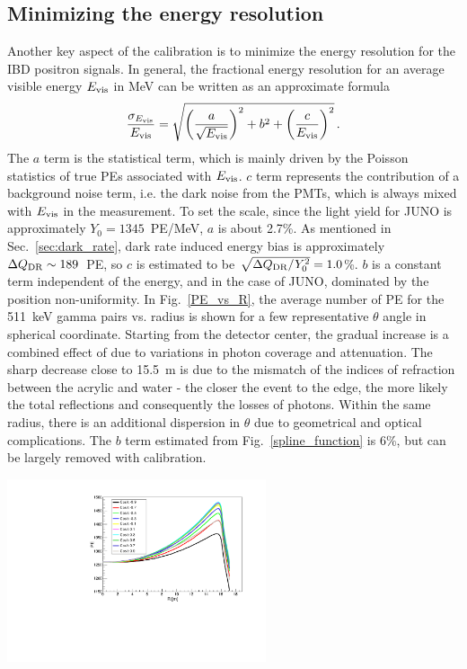 \documentclass[a4paper,10pt,twoside]{cpc-hepnp}
\begin{document}
\begin{CJK*}{GB}{gbsn}
\begin{multicols}{2}
\section{Minimizing the energy resolution}
\label{sec:resolution}
Another key aspect of the calibration is to minimize the energy
resolution for the IBD positron signals. In general, the fractional
energy resolution for an average visible energy $E_{\rm vis}$ in MeV can
be written as an approximate formula
\begin{eqnarray}
  \label{eq_resolution}
  \frac{\sigma_{E_{\rm vis}}}{E_{\rm vis}}=\sqrt{\left(\frac{a}{\sqrt{E_{\rm vis}}}\right)^{2}+b^{2}+\left(\frac{c}{E_{\rm vis}}\right)^{2}}\,.
\end{eqnarray}
The $a$ term is the statistical term, which is mainly driven by the
Poisson statistics of true PEs associated with $E_{\rm vis}$.  $c$
term represents the contribution of a background noise term, i.e. the
dark noise from the PMTs, which is always mixed with $E_{\rm vis}$ in
the measurement. To set the scale, since the light yield for JUNO is
approximately $Y_0 = 1345$~PE/MeV, $a$ is about 2.7\%. As mentioned in
Sec.~\ref{sec:dark_rate}, dark rate induced energy bias is
approximately $\Delta Q_{\rm DR}\sim189$~PE, so $c$ is estimated to be
$\sqrt{\Delta Q_{\rm DR}/Y_0^2}=1.0$\%. $b$ is a constant term independent of
the energy, and in the case of JUNO, dominated by the position
non-uniformity. In Fig.~\ref{PE_vs_R}, the average number of PE for
the 511~keV gamma pairs vs. radius is shown for a few representative
$\theta$ angle in spherical coordinate. Starting from the detector
center, the gradual increase is a combined effect of due to variations
in photon coverage and attenuation. The sharp decrease close to 15.5~m
is due to the mismatch of the indices of refraction between the
acrylic and water - the closer the event to the edge, the more likely
the total reflections and consequently the losses of photons. Within
the same radius, there is an additional dispersion in $\theta$ due to
geometrical and optical complications.  The $b$ term estimated from
Fig.~\ref{spline_function} is 6\%, but can be largely removed with
calibration.

\begin{center}
        \centering
        \includegraphics[width=3in]{PE_vs_R.pdf}
        \label{PE_vs_R}
\end{center}


\end{multicols}
\end{CJK*}
\end{document}
